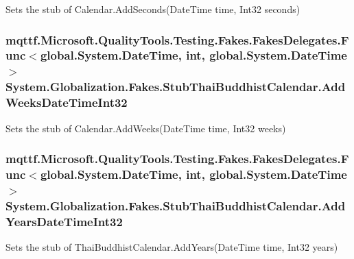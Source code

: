 Sets the stub of Calendar.\-Add\-Seconds(\-Date\-Time time, Int32 seconds)

\hypertarget{class_system_1_1_globalization_1_1_fakes_1_1_stub_thai_buddhist_calendar_a3344accc9895464fc7323fd2debfabd7}{
\subsubsection[{Add\-Weeks\-Date\-Time\-Int32}]{\setlength{\rightskip}{0pt plus 5cm}mqttf.\-Microsoft.\-Quality\-Tools.\-Testing.\-Fakes.\-Fakes\-Delegates.\-Func$<$global.\-System.\-Date\-Time, int, global.\-System.\-Date\-Time$>$ System.\-Globalization.\-Fakes.\-Stub\-Thai\-Buddhist\-Calendar.\-Add\-Weeks\-Date\-Time\-Int32}}\label{class_system_1_1_globalization_1_1_fakes_1_1_stub_thai_buddhist_calendar_a3344accc9895464fc7323fd2debfabd7}


Sets the stub of Calendar.\-Add\-Weeks(\-Date\-Time time, Int32 weeks)

\hypertarget{class_system_1_1_globalization_1_1_fakes_1_1_stub_thai_buddhist_calendar_aeb2d82c03bf926a3e0f6faff1ec1097a}{
\subsubsection[{Add\-Years\-Date\-Time\-Int32}]{\setlength{\rightskip}{0pt plus 5cm}mqttf.\-Microsoft.\-Quality\-Tools.\-Testing.\-Fakes.\-Fakes\-Delegates.\-Func$<$global.\-System.\-Date\-Time, int, global.\-System.\-Date\-Time$>$ System.\-Globalization.\-Fakes.\-Stub\-Thai\-Buddhist\-Calendar.\-Add\-Years\-Date\-Time\-Int32}}\label{class_system_1_1_globalization_1_1_fakes_1_1_stub_thai_buddhist_calendar_aeb2d82c03bf926a3e0f6faff1ec1097a}


Sets the stub of Thai\-Buddhist\-Calendar.\-Add\-Years(\-Date\-Time time, Int32 years)

